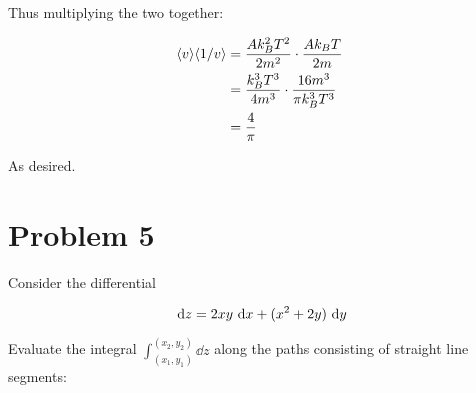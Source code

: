\documentclass{article}
\begin{document}
\begin{solution}
        Thus multiplying the two together: 

        \begin{align*}
            \langle v \rangle \langle 1/v \rangle &= \frac{Ak_B^2T^2}{2m^2} \cdot \frac{Ak_BT}{2m}\\
            &= \frac{k_B^3T^3}{4m^3} \cdot \frac{16m^3}{\pi k_B^3T^3}\\
            &= \frac{4}{\pi}
        \end{align*}

        As desired.
    \end{solution}

    \pagebreak

    \section*{Problem 5}

    Consider the differential 

    \[ \ \mathrm d z = 2xy \ \mathrm d x + (x^2 + 2y) \ \mathrm d y\] 

    Evaluate the integral $\int_{(x_1, y_1)}^{(x_2, y_2)} \dd z$ along the paths consisting of straight line segments:
\end{document}
